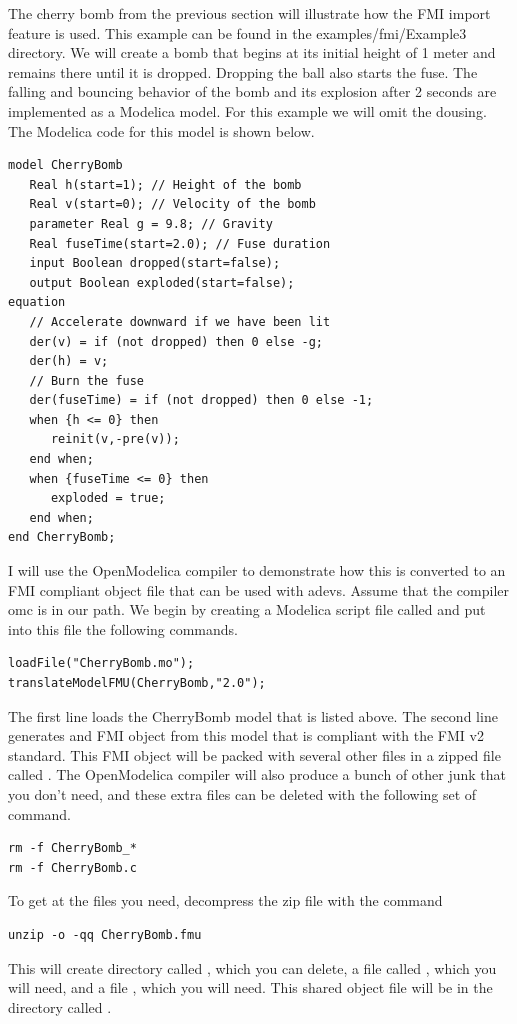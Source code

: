 The cherry bomb from the previous section will illustrate how the FMI import feature is used. This example can be found in the examples/fmi/Example3 directory. We will create a bomb that begins at its initial height of 1 meter and remains there until it is dropped. Dropping the ball also starts the fuse. The falling and bouncing behavior of the bomb and its explosion after 2 seconds are implemented as a Modelica model. For this example we will omit the dousing. The Modelica code for this model is shown below.
\begin{verbatim}
model CherryBomb
   Real h(start=1); // Height of the bomb
   Real v(start=0); // Velocity of the bomb
   parameter Real g = 9.8; // Gravity
   Real fuseTime(start=2.0); // Fuse duration
   input Boolean dropped(start=false); 
   output Boolean exploded(start=false);
equation
   // Accelerate downward if we have been lit
   der(v) = if (not dropped) then 0 else -g;
   der(h) = v;
   // Burn the fuse
   der(fuseTime) = if (not dropped) then 0 else -1;
   when {h <= 0} then
      reinit(v,-pre(v));
   end when;
   when {fuseTime <= 0} then
      exploded = true;
   end when;
end CherryBomb;
\end{verbatim}

I will use the OpenModelica compiler to demonstrate how this is converted to an FMI compliant object file that can be used with adevs. Assume that the compiler omc is in our path. We begin by creating a Modelica script file called  and put into this file the following commands.
\begin{verbatim}
loadFile("CherryBomb.mo");
translateModelFMU(CherryBomb,"2.0");
\end{verbatim}
The first line loads the CherryBomb model that is listed above. The second line generates and FMI object from this model that is compliant with the FMI v2 standard. This FMI object will be packed with several other files in a zipped file called . The OpenModelica compiler will also produce a bunch of other junk that you don't need, and these extra files can be deleted with the following set of command.
\begin{verbatim}
rm -f CherryBomb_*
rm -f CherryBomb.c
\end{verbatim}
To get at the files you need, decompress the zip file with the command
\begin{verbatim}
unzip -o -qq CherryBomb.fmu
\end{verbatim}
This will create directory called , which you can delete, a file called , which you will need, and a file , which you will need. This shared object file will be in the directory called .

